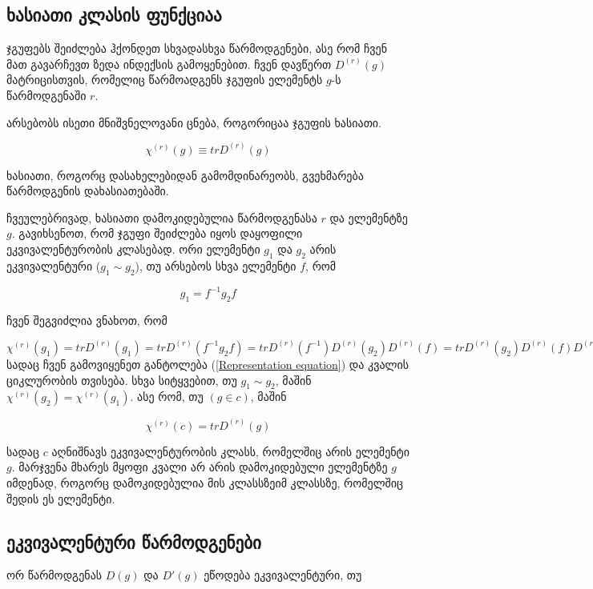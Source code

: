 \documentclass[12pt]{article}
\begin{document}
\begin{sloppypar}

\subsection{ხასიათი კლასის ფუნქციაა}
ჯგუფებს შეიძლება ჰქონდეთ სხვადასხვა წარმოდგენები, ასე რომ ჩვენ მათ გავარჩევთ ზედა ინდექსის გამოყენებით. ჩვენ დავწერთ $D^{(r)}(g)$ მატრიცისთვის, რომელიც წარმოადგენს ჯგუფის ელემენტს $g$-ს წარმოდგენაში $r$.
	
	არსებობს ისეთი მნიშვნელოვანი ცნება, როგორიცაა ჯგუფის ხასიათი.

\begin{equation} \label{Group character definition}
		 \chi^{(r)}(g) \equiv tr D^{(r)}(g)
\end{equation}

ხასიათი, როგორც დასახელებიდან გამომდინარეობს, გვეხმარება წარმოდგენის დახასიათებაში.

ჩვეულებრივად, ხასიათი დამოკიდებულია წარმოდგენასა $r$ და ელემენტზე $g$. გავიხსენოთ, რომ ჯგუფი შეიძლება იყოს დაყოფილი ეკვივალენტურობის კლასებად. ორი ელემენტი $g_1$ და $g_2$ არის ეკვივალენტური ($g_1 \sim g_2$), თუ არსებოს სხვა ელემენტი $f$, რომ 

\begin{equation} \label{Group equivalence definition}
		 g_1 = f^{-1}g_2f
\end{equation}

ჩვენ შეგვიძლია ვნახოთ, რომ 

$
\chi^{(r)}(g_1) = tr D^{(r)}(g_1) = tr D^{(r)}(f^{-1}g_2f) = tr D^{(r)}(f^{-1}) D^{(r)}(g_2) D^{(r)}(f) = 
tr D^{(r)}(g_2) D^{(r)}(f) D^{(r)}(f^{-1}) = tr D^{(r)}(g_2) D^{(r)}(I) = tr D^{(r)}(g_2) = \chi^{(r)}(g_2)
$
სადაც ჩვენ გამოვიყენეთ განტოლება (\ref{Representation equation}) და კვალის ციკლურობის თვისება. სხვა სიტყვებით, თუ $g_1 \sim g_2$, მაშინ $\chi^{(r)}(g_2) = \chi^{(r)}(g_1)$. ასე რომ, თუ $(g \in c)$, მაშინ

\begin{equation} \label{Trace depends on class}
	\chi^{(r)}(c) = tr D^{(r)}(g) 
\end{equation}

სადაც $c$ აღნიშნავს ეკვივალენტურობის კლასს, რომელშიც არის ელემენტი $g$. მარჯვენა მხარეს მყოფი კვალი არ არის დამოკიდებული ელემენტზე $g$ იმდენად, როგორც დამოკიდებულია მის კლასსზეიმ კლასსზე, რომელშიც შედის ეს ელემენტი.

\subsection{ეკვივალენტური წარმოდგენები}
ორ წარმოდგენას $D(g)$ და $D'(g)$ ეწოდება ეკვივალენტური, თუ 


\end{sloppypar}
\end{document}
